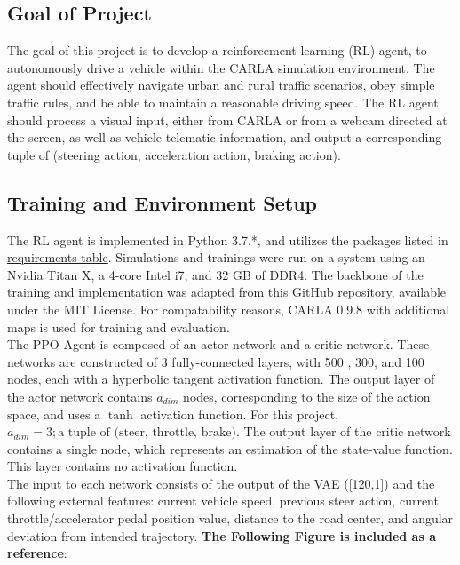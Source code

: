 \documentclass[12pt,oneside,letterpaper]{article}
\begin{document}
\subsection{Goal of Project}
The goal of this project is to develop a reinforcement learning (RL) agent,
to autonomously drive a vehicle within the CARLA simulation environment. The agent should effectively navigate urban and rural traffic scenarios, obey simple traffic rules, and be able to maintain a reasonable driving speed. The RL agent should process a visual input, either from CARLA or from a webcam directed at the screen, as well as vehicle telematic information, and output a corresponding tuple of (steering action, acceleration action, braking action).
\subsection{Training and Environment Setup}
The RL agent is implemented in Python 3.7.*, and utilizes the packages listed in \hyperlink{table:RequirementsTable}{requirements table}. Simulations and trainings were run on a system using an Nvidia Titan X, a 4-core Intel i7, and 32 GB of DDR4. The backbone of the training and implementation was adapted from \href{https://github.com/idreesshaikh/Autonomous-Driving-in-Carla-using-Deep-Reinforcement-Learning/tree/main}{this GitHub repository}, available under the MIT License. For compatability reasons, CARLA 0.9.8 with additional maps is used for training and evaluation. \\
The PPO Agent is composed of an actor network and a critic network. These networks are constructed of 3 fully-connected layers, with 500 , 300, and 100 nodes, each with a hyperbolic tangent activation function. The output layer of the actor network contains $a_{dim}$ nodes, corresponding to the size of the action space, and uses a $\tanh$ activation function. For this project, $a_{dim} = 3; \text{a tuple of (steer, throttle, brake)} $. The output layer of the critic network contains a single node, which represents an estimation of the state-value function. This layer contains no activation function. \\
The input to each network consists of the output of the VAE ([120,1]) and the following external features: current vehicle speed, previous steer action, current throttle/accelerator pedal position value, distance to the road center, and angular deviation from intended trajectory. \textbf{The Following Figure is included as a reference}:
\end{document}
